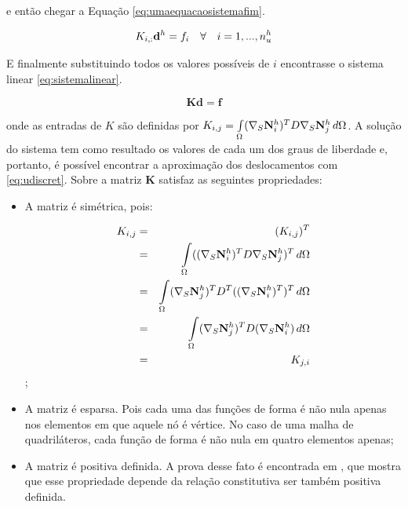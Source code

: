 e então chegar a Equação \eqref{eq:umaequacaosistemafim}.

\begin{equation} \label{eq:umaequacaosistemafim}
K_{i,:} \mathbf{d}^h = f_i \quad \forall \quad i=1,..., \freedomfine
\end{equation}

E finalmente substituindo todos os valores possíveis de $i$ encontrasse o sistema linear \eqref{eq:sistemalinear}.

\begin{equation}\label{eq:sistemalinear}
    \mathbf{K} \mathbf{d} = \mathbf{f}
\end{equation}



onde as entradas de $K$ são definidas por  $K_{i,j} = \omeint{\kij{i}{j}}$. A solução do sistema tem como resultado os valores de cada um dos graus de liberdade e, portanto, é possível encontrar a aproximação dos deslocamentos com \eqref{eq:udiscret}. Sobre a matriz $\mathbf{K}$ satisfaz as seguintes propriedades:


\begin{itemize}
    \item A matriz é simétrica, pois:

    \begin{eqnarray}
    K_{i,j} & = & (K_{i,j})^T \\
            & = & \omeint{((\sopnabla \basefunctionfine)^T D \sopnabla \basefunctionfine[j])^T} \\
            & = & \omeint{ ( \sopnabla \basefunctionfine[j])^T D^T  ((\sopnabla \basefunctionfine)^T)^T}\\
            & = & \omeint{ ( \sopnabla \basefunctionfine[j])^T D  (\sopnabla \basefunctionfine)} \\
            & = & K_{j,i}
    \end{eqnarray};


    \item A matriz é esparsa. Pois cada uma das funções de forma é não nula apenas nos elementos em que aquele nó é vértice. No caso de uma malha de quadriláteros, cada função de forma é não nula em quatro elementos apenas;

    \item A matriz é positiva definida. A prova desse fato é encontrada em \cite{hughes}, que mostra que esse propriedade depende da relação constitutiva ser também positiva definida.
\end{itemize}


